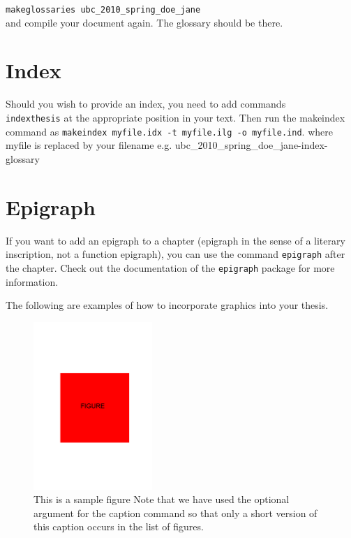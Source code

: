 \texttt{makeglossaries ubc\_2010\_spring\_doe\_jane}\\
and compile your document again. The glossary should be there.

\section{Index}

Should you wish to provide an index, you need to add commands
\texttt{\\index{thesis}} at the appropriate position in your
text. Then run the makeindex command as \texttt{makeindex myfile.idx
  -t myfile.ilg -o myfile.ind}.  where myfile is replaced by your
filename e.g. ubc\_2010\_spring\_doe\_jane-index-glossary

\section{Epigraph}

If you want to add an epigraph to a chapter (epigraph in the sense of
a literary inscription, not a function epigraph), you can use the
command \texttt{epigraph} after the chapter. Check out the
documentation of the \texttt{epigraph} package for more information.

The following are examples of how to incorporate graphics into your thesis.

\begin{figure}[ht]
  \begin{center}
    \includegraphics[width=0.4\textwidth]{figure}
    \caption[Sample figure.]{\label{fig:happy} This is a sample figure
      Note that we have
      used the optional argument for the caption command so that only
      a short version of this caption occurs in the list of figures.}
  \end{center}
\end{figure}

